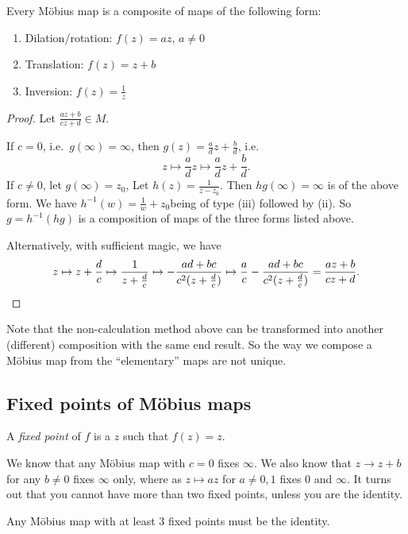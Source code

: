 \documentclass[a4paper]{article}
\begin{document}
\begin{prop}
  Every M\"obius map is a composite of maps of the following form:
  \begin{enumerate}
    \item Dilation/rotation: $f(z) = az$, $a\not= 0$
    \item Translation: $f(z) = z + b$
    \item Inversion: $f(z) = \frac{1}{z}$
  \end{enumerate}
\end{prop}
\begin{proof}
  Let $\frac{az + b}{cz + d}\in M$.

  If $c = 0$, i.e.\ $g(\infty) = \infty$, then $g(z) = \frac{a}{d}z + \frac{b}{d}$, i.e.
  \[
    z\mapsto \frac{a}{d} z\mapsto \frac{a}{d}z + \frac{b}{d}.
  \]
  If $c\not= 0$, let $g(\infty)=z_0$, Let $h(z) = \frac{1}{z - z_0}$. Then $hg(\infty) = \infty$ is of the above form. We have $h^{-1}(w) = \frac{1}{w} + z_0$being of type (iii) followed by (ii). So $g = h^{-1} (hg)$ is a composition of maps of the three forms listed above.

  Alternatively, with sufficient magic, we have
  \[
    z\mapsto z + \frac{d}{c} \mapsto \frac{1}{z + \frac{d}{c}} \mapsto -\frac{ad + bc}{c^2(z + \frac{d}{c})}\mapsto \frac{a}{c} -\frac{ad + bc}{c^2(z + \frac{d}{c})} = \frac{az + b}{cz + d}.\qedhere
  \]
\end{proof}
Note that the non-calculation method above can be transformed into another (different) composition with the same end result. So the way we compose a M\"obius map from the ``elementary'' maps are not unique.

\subsection{Fixed points of M\texorpdfstring{\"o}{o}bius maps}
\begin{defi}
  A \emph{fixed point} of $f$ is a $z$ such that $f(z) = z$.
\end{defi}

We know that any M\"obius map with $c = 0$ fixes $\infty$. We also know that $z\to z + b$ for any $b\not= 0$ fixes $\infty$ only, where as $z\mapsto az$ for $a\not= 0, 1$ fixes $0$ and $\infty$. It turns out that you cannot have more than two fixed points, unless you are the identity.

\begin{prop}
  Any M\"obius map with at least 3 fixed points must be the identity.
\end{prop}
\end{document}
